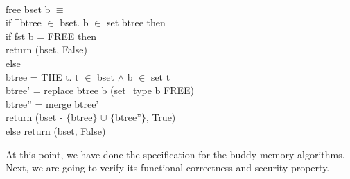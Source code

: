 \begin{definition}  \\
	free bset b $\equiv$ \\
	\phantom{x} \hspace{10pt} if $\exists$btree $\in$ bset. b $\in$ set btree then \\
	\phantom{x} \hspace{20pt} if fst b = FREE then \\
	\phantom{x} \hspace{30pt} return (bset, False) \\
	\phantom{x} \hspace{20pt} else \\
	\phantom{x} \hspace{30pt} btree = THE t. t $\in$ bset $\wedge$ b $\in$ set t \\
	\phantom{x} \hspace{30pt} btree' = replace btree b (set\_type b FREE) \\
	\phantom{x} \hspace{30pt} btree'' = merge btree' \\
	\phantom{x} \hspace{30pt} return (bset - $\lbrace$btree$\rbrace$ $\cup$ $\lbrace$btree''$\rbrace$, True) \\
	\phantom{x} \hspace{10pt} else return (bset, False)
\end{definition}

At this point, we have done the specification for the buddy memory algorithms. Next, we are going to verify its functional correctness and security property.